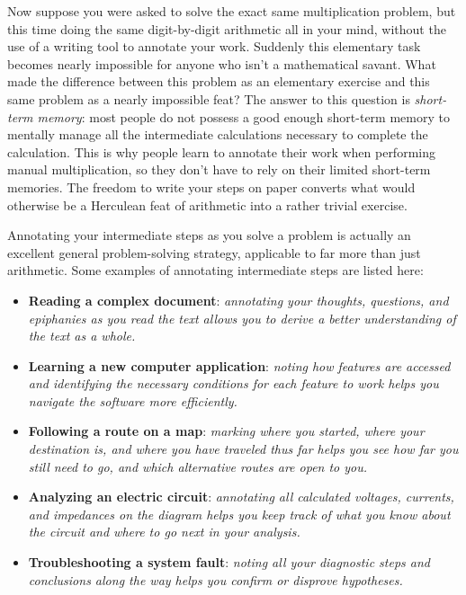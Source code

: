 Now suppose you were asked to solve the exact same multiplication problem, but this time doing the same digit-by-digit arithmetic all in your mind, without the use of a writing tool to annotate your work.  Suddenly this elementary task becomes nearly impossible for anyone who isn't a mathematical savant.  What made the difference between this problem as an elementary exercise and this same problem as a nearly impossible feat?  The answer to this question is \textit{short-term memory}: most people do not possess a good enough short-term memory to mentally manage all the intermediate calculations necessary to complete the calculation.  This is why people learn to annotate their work when performing manual multiplication, so they don't have to rely on their limited short-term memories.  The freedom to write your steps on paper converts what would otherwise be a Herculean feat of arithmetic into a rather trivial exercise.

\vskip 10pt

Annotating your intermediate steps as you solve a problem is actually an excellent general problem-solving strategy, applicable to far more than just arithmetic.  Some examples of annotating intermediate steps are listed here:

\begin{itemize}
\item \textbf{Reading a complex document}: \textit{annotating your thoughts, questions, and epiphanies as you read the text allows you to derive a better understanding of the text as a whole.}
\item \textbf{Learning a new computer application}: \textit{noting how features are accessed and identifying the necessary conditions for each feature to work helps you navigate the software more efficiently.}
\item \textbf{Following a route on a map}: \textit{marking where you started, where your destination is, and where you have traveled thus far helps you see how far you still need to go, and which alternative routes are open to you.}
\item \textbf{Analyzing an electric circuit}: \textit{annotating all calculated voltages, currents, and impedances on the diagram helps you keep track of what you know about the circuit and where to go next in your analysis.}
\item \textbf{Troubleshooting a system fault}: \textit{noting all your diagnostic steps and conclusions along the way helps you confirm or disprove hypotheses.}
\end{itemize}

